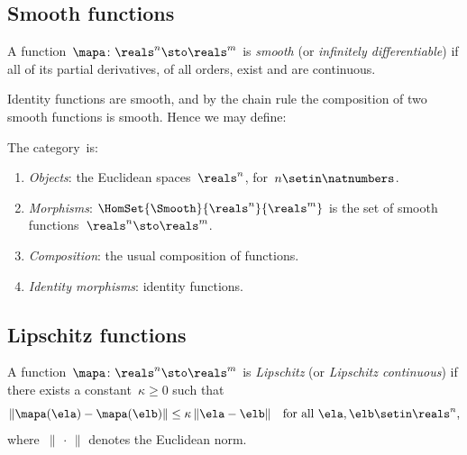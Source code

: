 \subsection{Smooth functions}

\begin{definition}
    \label{def:smooth-function}
    A function~$\mapa \colon \reals^n \sto \reals^m$ is \emph{smooth} (or \emph{infinitely differentiable}) if all of its partial derivatives, of all orders, exist and are continuous.
\end{definition}

Identity functions are smooth, and by the chain rule the composition of two smooth functions is smooth.
Hence we may define:

\begin{ctdefinition}
    \label{def:cat-Smooth}
    The category~\Smooth is:
    \begin{enumerate}
        \item \emph{Objects}: the Euclidean spaces~$\reals^n$, for~$n \setin \natnumbers$.
        \item \emph{Morphisms}: $\HomSet{\Smooth}{\reals^n}{\reals^m}$ is the set of smooth functions~$\reals^n \sto \reals^m$.
        \item \emph{Composition}: the usual composition of functions.
        \item \emph{Identity morphisms}: identity functions.
    \end{enumerate}
\end{ctdefinition}

\subsection{Lipschitz functions}

\begin{definition}
    \label{def:Lipschitz}
    A function~$\mapa \colon \reals^n \sto \reals^m$ is \emph{Lipschitz} (or \emph{Lipschitz continuous}) if there exists a constant~$\kappa \geq 0$ such that
    \begin{equation}
        \lVert \mapa(\ela) - \mapa(\elb) \rVert \leq \kappa \, \lVert \ela - \elb \rVert
        \quad \text{for all } \ela, \elb \setin \reals^n,
    \end{equation}
    where~$\lVert \,\cdot\, \rVert$ denotes the Euclidean norm.
\end{definition}

